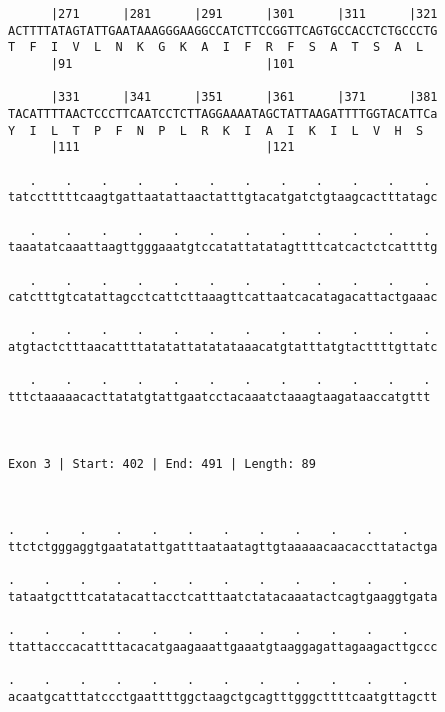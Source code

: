 \documentclass{article}
\begin{document}
\begin{Verbatim}
      |271      |281      |291      |301      |311      |321
ACTTTTATAGTATTGAATAAAGGGAAGGCCATCTTCCGGTTCAGTGCCACCTCTGCCCTG
T  F  I  V  L  N  K  G  K  A  I  F  R  F  S  A  T  S  A  L  
      |91                           |101                    
  
      |331      |341      |351      |361      |371      |381
TACATTTTAACTCCCTTCAATCCTCTTAGGAAAATAGCTATTAAGATTTTGGTACATTCa
Y  I  L  T  P  F  N  P  L  R  K  I  A  I  K  I  L  V  H  S  
      |111                          |121                    
  
   .    .    .    .    .    .    .    .    .    .    .    . 
tatcctttttcaagtgattaatattaactatttgtacatgatctgtaagcactttatagc
                                                            
   .    .    .    .    .    .    .    .    .    .    .    . 
taaatatcaaattaagttgggaaatgtccatattatatagttttcatcactctcattttg
                                                            
   .    .    .    .    .    .    .    .    .    .    .    . 
catctttgtcatattagcctcattcttaaagttcattaatcacatagacattactgaaac
                                                            
   .    .    .    .    .    .    .    .    .    .    .    . 
atgtactctttaacattttatatattatatataaacatgtatttatgtacttttgttatc
                                                            
   .    .    .    .    .    .    .    .    .    .    .    .
tttctaaaaacacttatatgtattgaatcctacaaatctaaagtaagataaccatgttt
                                                           
                                                           
 
Exon 3 | Start: 402 | End: 491 | Length: 89



.    .    .    .    .    .    .    .    .    .    .    .    
ttctctgggaggtgaatatattgatttaataatagttgtaaaaacaacaccttatactga
                                                            
.    .    .    .    .    .    .    .    .    .    .    .    
tataatgctttcatatacattacctcatttaatctatacaaatactcagtgaaggtgata
                                                            
.    .    .    .    .    .    .    .    .    .    .    .    
ttattacccacattttacacatgaagaaattgaaatgtaaggagattagaagacttgccc
                                                            
.    .    .    .    .    .    .    .    .    .    .    .    
acaatgcatttatccctgaattttggctaagctgcagtttgggcttttcaatgttagctt
                                                            

\end{Verbatim}
\end{document}
